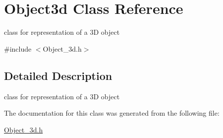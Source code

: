 \hypertarget{class_object3d}{}\section{Object3d Class Reference}
\label{class_object3d}


class for representation of a 3D object  




{\ttfamily \#include $<$Object\+\_\+3d.\+h$>$}



\subsection{Detailed Description}
class for representation of a 3D object 

The documentation for this class was generated from the following file\+:\begin{DoxyCompactItemize}
\item 
\hyperlink{_object__3d_8h}{Object\+\_\+3d.\+h}\end{DoxyCompactItemize}
